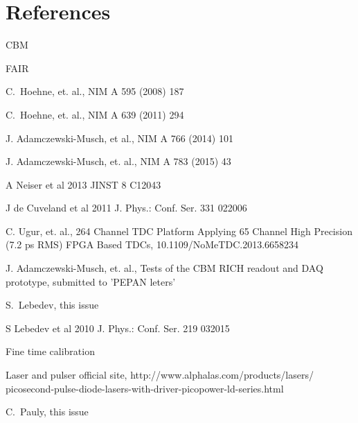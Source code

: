 \documentclass[final,5p,times,twocolumn]{elsarticle}
\begin{document}

\section*{References}

\begin{thebibliography}{99}

CBM

FAIR

C.~Hoehne, et. al.,
NIM A 595 (2008) 187

C.~Hoehne, et. al.,
NIM A 639 (2011) 294

J. Adamczewski-Musch, et al.,
NIM A 766 (2014) 101

J. Adamczewski-Musch, et. al.,
NIM A 783 (2015) 43

A Neiser et al 2013 JINST 8 C12043

J de Cuveland et al 2011 J. Phys.: Conf. Ser. 331 022006

C. Ugur, et. al.,
264 Channel TDC Platform Applying 65 Channel High Precision (7.2 ps RMS) FPGA Based TDCs,
10.1109/NoMeTDC.2013.6658234

J. Adamczewski-Musch, et. al.,
Tests of the CBM RICH readout and DAQ prototype,
submitted to 'PEPAN leters'

S.~Lebedev,
this issue

S Lebedev et al 2010 J. Phys.: Conf. Ser. 219 032015 

Fine time calibration

Laser and pulser official site,
http://www.alphalas.com/products/lasers/ picosecond-pulse-diode-lasers-with-driver-picopower-ld-series.html

C.~Pauly,
this issue

\end{thebibliography}

\end{document}
